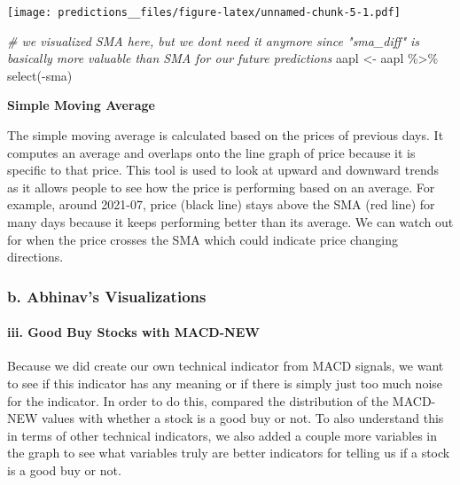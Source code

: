 \documentclass[
]{article}
\newenvironment{Shaded}{\begin{snugshade}}{\end{snugshade}}
\newcommand{\CommentTok}[1]{\textcolor[rgb]{0.56,0.35,0.01}{\textit{#1}}}
\newcommand{\FunctionTok}[1]{\textcolor[rgb]{0.00,0.00,0.00}{#1}}
\newcommand{\NormalTok}[1]{#1}
\newcommand{\OtherTok}[1]{\textcolor[rgb]{0.56,0.35,0.01}{#1}}
\newcommand{\SpecialCharTok}[1]{\textcolor[rgb]{0.00,0.00,0.00}{#1}}
\begin{document}
\texttt{[image: predictions\_\_files/figure-latex/unnamed-chunk-5-1.pdf]}

\begin{Shaded}
\begin{Highlighting}[]
\CommentTok{\# we visualized SMA here, but we dont need it anymore since "sma\_diff" is basically more valuable than SMA for our future predictions }
\NormalTok{aapl }\OtherTok{\textless{}{-}}\NormalTok{ aapl }\SpecialCharTok{\%\textgreater{}\%}
  \FunctionTok{select}\NormalTok{(}\SpecialCharTok{{-}}\NormalTok{sma)}
\end{Highlighting}
\end{Shaded}

\textbf{Simple Moving Average}

The simple moving average is calculated based on the prices of previous
days. It computes an average and overlaps onto the line graph of price
because it is specific to that price. This tool is used to look at
upward and downward trends as it allows people to see how the price is
performing based on an average. For example, around 2021-07, price
(black line) stays above the SMA (red line) for many days because it
keeps performing better than its average. We can watch out for when the
price crosses the SMA which could indicate price changing directions.

\hypertarget{b.-abhinavs-visualizations}{%
\subsubsection{\texorpdfstring{\textbf{b. Abhinav's
Visualizations}}{b. Abhinav's Visualizations}}\label{b.-abhinavs-visualizations}}

\hypertarget{iii.-good-buy-stocks-with-macd-new}{%
\paragraph{iii. Good Buy Stocks with
MACD-NEW}\label{iii.-good-buy-stocks-with-macd-new}}

Because we did create our own technical indicator from MACD signals, we
want to see if this indicator has any meaning or if there is simply just
too much noise for the indicator. In order to do this, compared the
distribution of the MACD-NEW values with whether a stock is a good buy
or not. To also understand this in terms of other technical indicators,
we also added a couple more variables in the graph to see what variables
truly are better indicators for telling us if a stock is a good buy or
not.
\end{document}
